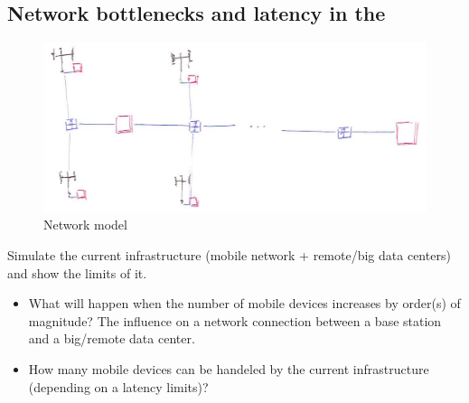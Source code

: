 \subsection{Network bottlenecks and latency in the \xcloud}

\begin{figure}[tb]
	\centering
	\includegraphics[width=\linewidth]{congestion_delay.jpg} 
	\caption{Network model}
	\label{fig:network_model}
\end{figure}

Simulate the current infrastructure (mobile network + remote/big data centers) and show the limits of it.

\begin{itemize}
\item What will happen when the number of mobile devices increases by order(s) of magnitude? The influence on a network connection between a base station and a big/remote data center.
\item How many mobile devices can be handeled by the current infrastructure (depending on a latency limits)?
\end{itemize}

